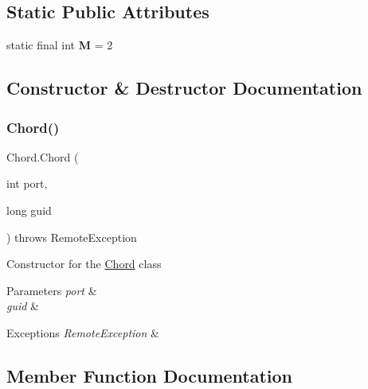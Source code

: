 \subsection*{Static Public Attributes}
\begin{DoxyCompactItemize}
\item 
\mbox{\label{class_chord_a864e0b4011dc157c78a06dd951c6d9ac}} 
static final int {\bfseries M} = 2
\end{DoxyCompactItemize}


\subsection{Constructor \& Destructor Documentation}
\mbox{\label{class_chord_a6e4b3112b0268455fd599c57b5479791}} 
\subsubsection{\texorpdfstring{Chord()}{Chord()}}
{\footnotesize\ttfamily Chord.\+Chord (\begin{DoxyParamCaption}\item[{int}]{port,  }\item[{long}]{guid }\end{DoxyParamCaption}) throws Remote\+Exception\hspace{0.3cm}{\ttfamily [inline]}}

Constructor for the \mbox{\hyperlink{class_chord}{Chord}} class 
\begin{DoxyParams}{Parameters}
{\em port} & \\
\hline
{\em guid} & \\
\hline
\end{DoxyParams}

\begin{DoxyExceptions}{Exceptions}
{\em Remote\+Exception} & \\
\hline
\end{DoxyExceptions}


\subsection{Member Function Documentation}
\mbox{\label{class_chord_a530b2ab58c9f4026dadf4293c38c4450}} 
